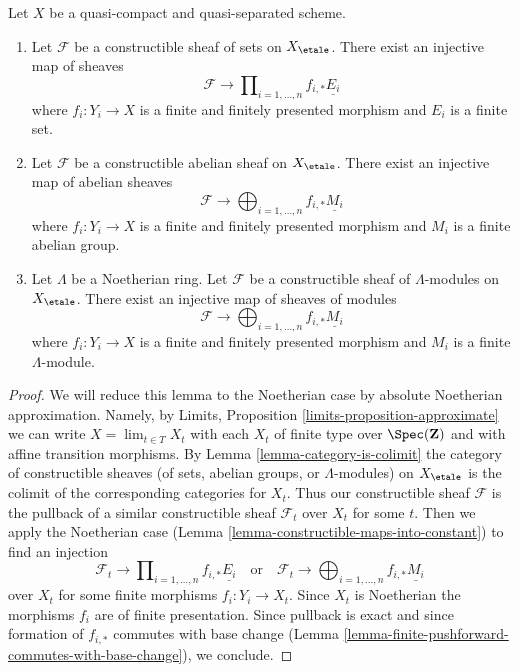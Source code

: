 \begin{lemma}
\label{lemma-constructible-maps-into-constant-general}
\begin{reference}
\cite[Exposee IX, Proposition 2.14]{SGA4}
\end{reference}
Let $X$ be a quasi-compact and quasi-separated scheme.
\begin{enumerate}
\item Let $\mathcal{F}$ be a constructible sheaf of sets on $X_\etale$.
There exist an injective map of sheaves
$$
\mathcal{F} \longrightarrow
\prod\nolimits_{i = 1, \ldots, n} f_{i, *}\underline{E_i}
$$
where $f_i : Y_i \to X$ is a finite and finitely presented morphism and
$E_i$ is a finite set.
\item Let $\mathcal{F}$ be a constructible abelian sheaf on $X_\etale$.
There exist an injective map of abelian sheaves
$$
\mathcal{F} \longrightarrow
\bigoplus\nolimits_{i = 1, \ldots, n} f_{i, *}\underline{M_i}
$$
where $f_i : Y_i \to X$ is a finite and finitely presented morphism and
$M_i$ is a finite abelian group.
\item Let $\Lambda$ be a Noetherian ring.
Let $\mathcal{F}$ be a constructible sheaf of $\Lambda$-modules on $X_\etale$.
There exist an injective map of sheaves of modules
$$
\mathcal{F} \longrightarrow
\bigoplus\nolimits_{i = 1, \ldots, n} f_{i, *}\underline{M_i}
$$
where $f_i : Y_i \to X$ is a finite and finitely presented morphism and
$M_i$ is a finite $\Lambda$-module.
\end{enumerate}
\end{lemma}

\begin{proof}
We will reduce this lemma to the Noetherian case by absolute Noetherian
approximation. Namely, by
Limits, Proposition \ref{limits-proposition-approximate}
we can write $X = \lim_{t \in T} X_t$ with each $X_t$ of finite type over
$\Spec(\mathbf{Z})$ and with affine transition morphisms. By
Lemma \ref{lemma-category-is-colimit}
the category of constructible sheaves (of sets, abelian groups, or
$\Lambda$-modules) on $X_\etale$ is the colimit of the corresponding
categories for $X_t$. Thus our constructible sheaf $\mathcal{F}$
is the pullback of a similar constructible sheaf $\mathcal{F}_t$
over $X_t$ for some $t$. Then we apply the Noetherian case
(Lemma \ref{lemma-constructible-maps-into-constant})
to find an injection
$$
\mathcal{F}_t \longrightarrow
\prod\nolimits_{i = 1, \ldots, n} f_{i, *}\underline{E_i}
\quad\text{or}\quad
\mathcal{F}_t \longrightarrow
\bigoplus\nolimits_{i = 1, \ldots, n} f_{i, *}\underline{M_i}
$$
over $X_t$ for some finite morphisms $f_i : Y_i \to X_t$.
Since $X_t$ is Noetherian the morphisms $f_i$ are of finite presentation.
Since pullback is exact and since formation of $f_{i, *}$ commutes
with base change
(Lemma \ref{lemma-finite-pushforward-commutes-with-base-change}), we conclude.
\end{proof}

